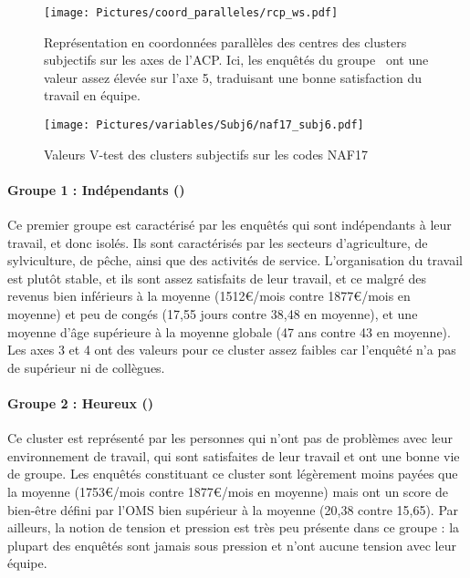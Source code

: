 \documentclass[11pt,fleqn,openany,frenchb]{book} %
\begin{document}
\begin{figure}[!h]
\centering
  \texttt{[image: Pictures/coord\_paralleles/rcp\_ws.pdf]}
\caption{{Représentation en coordonnées parallèles des centres des clusters subjectifs sur les axes de l'ACP. Ici, les enquêtés du groupe \HEUR\ ont une valeur assez élevée sur l'axe 5, traduisant une bonne satisfaction du travail en équipe.}}
\label{fig:CPsubj}
\end{figure}

\begin{figure}[!h]
\centering
  \texttt{[image: Pictures/variables/Subj6/naf17\_subj6.pdf]}
\caption{Valeurs V-test des clusters subjectifs sur les codes NAF17}
\label{fig:nafsubj}
\end{figure}

\paragraph{Groupe 1 : Indépendants (\INDEP)\\}
Ce premier groupe est caractérisé par les enquêtés qui sont indépendants à leur travail, et donc isolés. Ils sont caractérisés par les secteurs d'agriculture,  de sylviculture, de pêche, ainsi que des activités de service. L'organisation du travail est plutôt stable, et ils sont assez satisfaits de leur travail, et ce malgré des revenus bien inférieurs à la moyenne (1512\euro{}/mois contre 1877\euro{}/mois en moyenne) et peu de congés (17,55 jours contre 38,48 en moyenne), et une moyenne d'âge supérieure à la moyenne globale (47 ans contre 43 en moyenne). Les axes 3 et 4 ont des valeurs pour ce cluster assez faibles car l'enquêté n'a pas de supérieur ni de collègues.

\paragraph{Groupe 2 : Heureux (\HEUR)\\}
Ce cluster est représenté par les personnes qui n'ont pas de problèmes avec leur environnement de travail, qui sont satisfaites de leur travail et ont une bonne vie de groupe. Les enquêtés constituant ce cluster sont légèrement moins payées que la moyenne (1753\euro{}/mois contre 1877\euro{}/mois en moyenne) mais ont un score de bien-être défini par l'OMS bien supérieur à la moyenne (20,38 contre 15,65). Par ailleurs, la notion de tension et pression est très peu présente dans ce groupe : la plupart des enquêtés sont jamais sous pression et n'ont aucune tension avec leur équipe.
\end{document}

